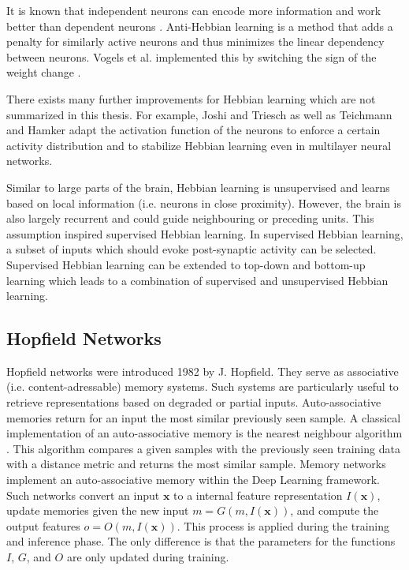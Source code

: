 It is known that independent neurons can encode more information and work better than dependent neurons .
Anti-Hebbian learning is a method that adds a penalty for similarly active neurons and thus minimizes the linear dependency between neurons.
Vogels et al. implemented this by switching the sign of the weight change .

There exists many further improvements for Hebbian learning which are not summarized in this thesis.
For example, Joshi and Triesch  as well as Teichmann and Hamker  adapt the activation function of the neurons to enforce a certain activity distribution and to stabilize Hebbian learning even in multilayer neural networks.

Similar to large parts of the brain, Hebbian learning is unsupervised and learns based on local information (i.e. neurons in close proximity).
However, the brain is also largely recurrent and could guide neighbouring or preceding units.
This assumption inspired supervised Hebbian learning.
In supervised Hebbian learning, a subset of inputs which should evoke post-synaptic activity can be selected.
Supervised Hebbian learning can be extended to top-down and bottom-up learning  which leads to a combination of supervised and unsupervised Hebbian learning.


\subsection{Hopfield Networks}
Hopfield networks  were introduced 1982 by J. Hopfield.
They serve as associative (i.e. content-adressable) memory systems.
Such systems are particularly useful to retrieve representations based on degraded or partial inputs.
Auto-associative memories return for an input the most similar previously seen sample.
A classical implementation of an auto-associative memory is the nearest neighbour algorithm .
This algorithm compares a given samples with the previously seen training data with a distance metric and returns the most similar sample.
Memory networks  implement an auto-associative memory within the Deep Learning framework.
Such networks convert an input \(\boldsymbol{x}\) to a internal feature representation \(I(\boldsymbol{x})\), update memories given the new input \(m=G(m, I(\boldsymbol{x}))\), and compute the output features \(o=O(m, I(\boldsymbol{x}))\).
This process is applied during the training and inference phase.
The only difference is that the parameters for the functions \(I\), \(G\), and \(O\) are only updated during training.

